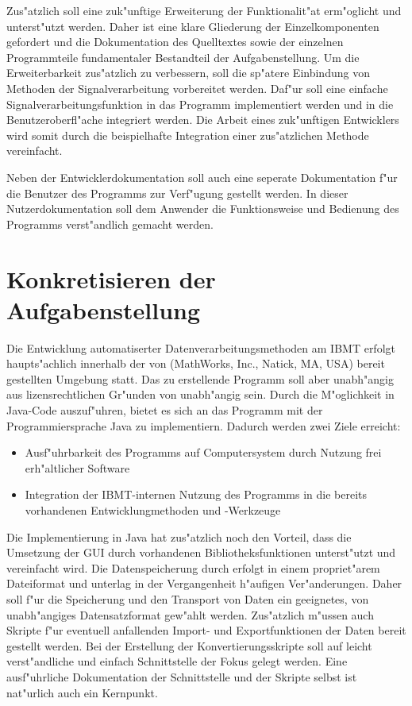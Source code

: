 Zus"atzlich soll eine zuk"unftige Erweiterung der Funktionalit"at erm"oglicht und unterst"utzt werden.
Daher ist eine klare Gliederung der Einzelkomponenten gefordert und die Dokumentation des Quelltextes sowie der einzelnen Programmteile fundamentaler Bestandteil der Aufgabenstellung.
Um die Erweiterbarkeit zus"atzlich zu verbessern, soll die sp"atere Einbindung von Methoden der Signalverarbeitung vorbereitet werden.
Daf"ur soll eine einfache Signalverarbeitungsfunktion in das Programm implementiert werden und in die Benutzeroberfl"ache integriert werden.
Die Arbeit eines zuk"unftigen Entwicklers wird somit durch die beispielhafte Integration einer zus"atzlichen Methode vereinfacht.

Neben der Entwicklerdokumentation soll auch eine seperate Dokumentation f"ur die Benutzer des Programms zur Verf"ugung gestellt werden.
In dieser Nutzerdokumentation soll dem Anwender die Funktionsweise und Bedienung des Programms verst"andlich gemacht werden.



\section{Konkretisieren der Aufgabenstellung}

Die Entwicklung automatiserter Datenverarbeitungsmethoden am \ac{IBMT} erfolgt haupts"achlich innerhalb der von \ml (MathWorks, Inc., Natick, MA, USA) bereit gestellten Umgebung statt.
Das zu erstellende Programm soll aber unabh"angig aus lizensrechtlichen Gr"unden von \ml unabh"angig sein.
Durch die M"oglichkeit in \ml Java-Code auszuf"uhren, bietet es sich an das Programm mit der Programmiersprache Java zu implementiern.
Dadurch werden zwei Ziele erreicht:
\begin{itemize}
	\item Ausf"uhrbarkeit des Programms auf Computersystem durch Nutzung frei erh"altlicher Software
	\item Integration der \ac{IBMT}-internen Nutzung des Programms in die bereits vorhandenen Entwicklungmethoden und -Werkzeuge
\end{itemize}
Die Implementierung in Java hat zus"atzlich noch den Vorteil, dass die Umsetzung der \ac{GUI} durch vorhandenen Bibliotheksfunktionen unterst"utzt und vereinfacht wird.
Die Datenspeicherung durch \ml erfolgt in einem propriet"arem Dateiformat und unterlag in der Vergangenheit h"aufigen Ver"anderungen.
Daher soll f"ur die Speicherung und den Transport von Daten ein geeignetes, von \ml unabh"angiges Datensatzformat gew"ahlt werden.
Zus"atzlich m"ussen auch Skripte f"ur eventuell anfallenden Import- und Exportfunktionen der Daten bereit gestellt werden.
Bei der Erstellung der Konvertierungsskripte soll auf leicht verst"andliche und einfach Schnittstelle der Fokus gelegt werden.
Eine ausf"uhrliche Dokumentation der Schnittstelle und der Skripte selbst ist nat"urlich auch ein Kernpunkt.

